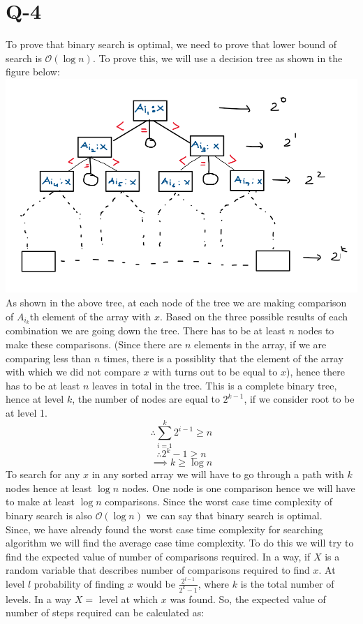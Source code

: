 \documentclass[14pt]{article}
\begin{document}
		\section*{Q-4}
			\noindent
			To prove that binary search is optimal, we need to prove that lower bound of search is $\mathcal{O}(\log{n})$. To prove this, we will use a decision tree as shown in the figure below:\\
			\includegraphics[scale=0.7]{tree.png}
			\linebreak
			As shown in the above tree, at each node of the tree we are making comparison of $A_{i_k}$th element of the array with $x$. Based on the three possible results of each combination we are going down the tree. There has to be at least $n$ nodes to make these comparisons. (Since there are $n$ elements in the array, if we are comparing less than $n$ times, there is a possiblity that the element of the array with which we did not compare $x$ with turns out to be equal to $x$), hence there has to be at least $n$ leaves in total in the tree. This is a complete binary tree, hence at level $k$, the number of nodes are equal to $2^{k-1}$, if we consider root to be at level 1.\\ 
			$$\therefore \sum_{i=1}^{k}2^{i-1} \geq n$$
			$$\therefore 2^{k}-1 \geq n$$
			$$\implies k \geq \log{n}$$
			To search for any $x$ in any sorted array we will have to go through a path with $k$ nodes hence at least $\log{n}$ nodes. One node is one comparison hence we will have to make at least $\log{n}$ comparisons. Since the worst case time complexity of binary search is also $\mathcal{O}(\log n)$ we can say that binary search is optimal.\\
			\linebreak
			Since, we have already found the worst case time complexity for searching algorithm we will find the average case time complexity. To do this we will try to find the expected value of number of comparisons required. In a way, if $X$ is a random variable that describes number of comparisons required to find $x$. At level $l$ probability of finding $x$ would be $\frac{2^{l-1}}{2^k - 1}$, where $k$ is the total number of levels. In a way $X =$ level at which $x$ was found. So, the expected value of number of steps required can be calculated as:
\end{document}
